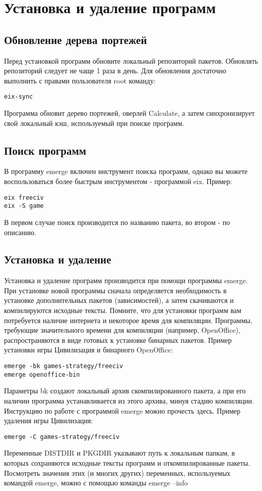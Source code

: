 \section{Установка и удаление программ}
\subsection{Обновление дерева портежей}
Перед установкой программ обновите локальный репозиторий пакетов. Обновлять репозиторий следует не чаще 1 раза в день.
Для обновления достаточно выполнить с правами пользователя root команду:
\begin{verbatim}
eix-sync
\end{verbatim}

Программа обновит дерево портежей, оверлей Calculate, а затем синхронизирует свой локальный кэш, используемый при поиске программ.

\subsection{Поиск программ}
В программу emerge включен инструмент поиска программ, однако вы можете воспользоваться более быстрым инструментом - программой eix.
Пример:
\begin{verbatim}
eix freeciv
eix -S game
\end{verbatim}
В первом случае поиск производится по названию пакета, во втором - по описанию.

\subsection{Установка и удаление}
Установка и удаление программ производится при помощи программы emerge. При установке новой программы сначала определяется необходимость в установке дополнительных пакетов (зависимостей), а затем скачиваются и компилируются исходные тексты. Помните, что для установки программ вам потребуется наличие интернета и некоторое время для компиляции. Программы, требующие значительного времени для компиляции (например, OpenOffice), распространяются в виде готовых к установке бинарных пакетов.
Пример установки игры Цивилизация и бинарного OpenOffice:
\begin{verbatim}
emerge -bk games-strategy/freeciv
emerge openoffice-bin
\end{verbatim}

Параметры bk создают локальный архив скомпилированного пакета, а при его наличии программа устанавливается из этого архива, минуя стадию компиляции. Инструкцию по работе с программой emerge можно прочесть здесь.
Пример удаления игры Цивилизация:
\begin{verbatim}
emerge -C games-strategy/freeciv
\end{verbatim}
Переменные DISTDIR и PKGDIR указывают путь к локальным папкам, в которых сохраняются исходные тексты программ и откомпилированные пакеты. Посмотреть значения этих (и многих других) переменных, используемых командой emerge, можно с помощью команды
emerge --info
